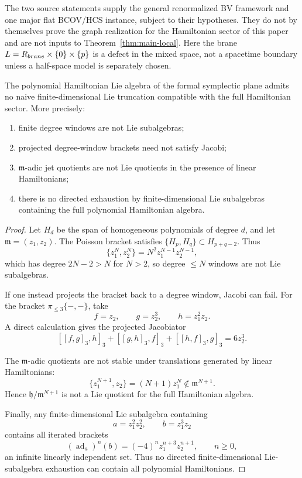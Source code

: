 \documentclass[11pt]{memoir}
\begin{document}
\begin{rmk}
  The two source statements supply the general renormalized BV framework and
  one major flat BCOV/HCS instance, subject to their hypotheses. They do not by
  themselves prove the graph realization for the Hamiltonian sector of this
  paper and are not inputs to Theorem~\ref{thm:main-local}. Here the brane
  \(L=R_{brane}\times\{0\}\times\{p\}\) is a defect in the mixed space, not a spacetime boundary unless a
  half-space model is separately chosen.
\end{rmk}

\begin{lem}\label{lem:finite-window-hamiltonian-obstruction}
  The polynomial Hamiltonian Lie algebra of the formal symplectic plane admits
  no naive finite-dimensional Lie truncation compatible with the full
  Hamiltonian sector. More precisely:
  \begin{enumerate}
    \item finite degree windows are not Lie subalgebras;
    \item projected degree-window brackets need not satisfy Jacobi;
    \item $\mathfrak m$-adic jet quotients are not Lie quotients in the
      presence of linear Hamiltonians;
    \item there is no directed exhaustion by finite-dimensional Lie subalgebras
      containing the full polynomial Hamiltonian algebra.
  \end{enumerate}
\end{lem}

\begin{proof}
  Let $H_d$ be the span of homogeneous polynomials of degree $d$, and let
  $\mathfrak m=(z_1,z_2)$. The Poisson bracket satisfies
  $\{H_p,H_q\}\subset H_{p+q-2}$. Thus
  $$\{z_1^N,z_2^N\}=N^2z_1^{N-1}z_2^{N-1},$$
  which has degree $2N-2>N$ for $N>2$, so degree $\leq N$ windows are not Lie
  subalgebras.

  If one instead projects the bracket back to a degree window, Jacobi can fail.
  For the bracket $\pi_{\leq3}\{-,-\}$, take
  $$f=z_2,\qquad g=z_2^3,\qquad h=z_1^2z_2.$$
  A direct calculation gives the projected Jacobiator
  $$[[f,g]_3,h]_3+[[g,h]_3,f]_3+[[h,f]_3,g]_3=6z_2^3.$$

  The $\mathfrak m$-adic quotients are not stable under translations generated
  by linear Hamiltonians:
  $$\{z_1^{N+1},z_2\}=(N+1)z_1^N\notin\mathfrak m^{N+1}.$$
  Hence $\mathfrak h/\mathfrak m^{N+1}$ is not a Lie quotient for the full
  Hamiltonian algebra.

  Finally, any finite-dimensional Lie subalgebra containing
  $$a=z_1^2z_2^2,\qquad b=z_1^3z_2$$
  contains all iterated brackets
  $$(\operatorname{ad}_a)^n(b)=(-4)^n z_1^{n+3}z_2^{n+1},\qquad n\geq0,$$
  an infinite linearly independent set. Thus no directed finite-dimensional
  Lie-subalgebra exhaustion can contain all polynomial Hamiltonians.
\end{proof}
\end{document}
